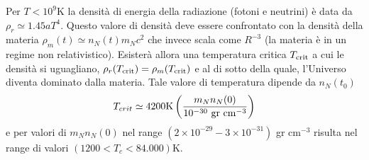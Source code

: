 Per $T<10^9$K la densità di energia della radiazione (fotoni e neutrini) è data
da $\rho_r \simeq 1.45 a T^4$.  Questo valore di densità deve essere confrontato
con la densità della materia $\rho_m(t) \simeq n_N(t) m_N c^2$ che invece scala
come $R^{-3}$ (la materia è in un regime non relativistico).  Esisterà allora
una temperatura critica $T_{\textup{crit}}$ a cui le densità si uguagliano,
$\rho_r(T_{\textup{crit}}) = \rho_m (T_{\textup{crit}})$ e al di sotto della
quale, l'Universo diventa dominato dalla materia.  Tale valore di temperatura
dipende da $n_N(t_0)$
\begin{equation}
  T_{crit} \simeq 4200\text{K} \left( \frac {m_N n_N(0)}{10^{-30}~{\rm gr~ cm}^{-3}} \right)
\end{equation}
e per valori di $m_N n_N(0)$ nel range $(2 \times 10^{-29} - 3 \times 10^{-31})$
gr cm$^{-3}$ risulta nel range di valori $(1200 < T_c < 84.000)$K.

